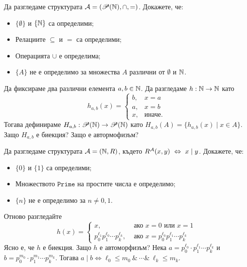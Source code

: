 \begin{problem}
  Да разгледаме структурата $\mathcal{A} = (\mathscr{P}(\mathbb{N}), \cap, =)$.  Докажете, че:
  \begin{itemize}
  \item
    $\{\emptyset\}$ и $\{\mathbb{N}\}$ са определими;
  \item
    Релациите $\subseteq$ и $=$ са определими;
  \item
    Операцията $\cup$ е определима;
  \item
    $\{A\}$ не е определимо за множества $A$ различни от $\emptyset$ и $\mathbb{N}$.
  \end{itemize}
\end{problem}
\begin{hint}
  Да фиксираме два различни елемента $a,b\in\mathbb{N}$.
  Да разгледаме $h:\mathbb{N} \to \mathbb{N}$ като
  \[h_{a,b}(x) =
    \begin{cases}
      b, & x = a\\
      a, & x = b\\
      x, & \text{иначе}.
    \end{cases}\]
  Тогава дефинираме $H_{a,b}:\mathscr{P}(\mathbb{N}) \to \mathscr{P}(\mathbb{N})$ като
  $H_{a,b}(A) = \{h_{a,b}(x) \mid x \in A\}$.
  Защо $H_{a,b}$ е биекция? Защо е автормофизъм?
\end{hint}

\begin{problem}
  Да разгледаме структурата $\mathcal{A} = (\mathbb{N}, R)$, където $R^{\mathcal{A}}(x,y) \ \Leftrightarrow\  x \mid y$.
  Докажете, че:
  \begin{itemize}
  \item
    $\{0\}$ и $\{1\}$ са определими;
  \item
    Множеството $\texttt{Prime}$ на простите числа е определимо;
  \item
    $\{n\}$ не е определимо за $n \neq 0,1$.
  \end{itemize}
\end{problem}
\begin{hint}
  Отново разгледайте
  \[h(x) =
    \begin{cases}
      x, & \text{ ако }x = 0 \text{ или } x = 1\\
      p^{\ell_1}_0p^{\ell_0}_1\cdots p^{\ell_k}_k, & \text{ ако }x = p^{\ell_0}_0 p^{\ell_1}_1 \cdots p^{\ell_k}_k
    \end{cases}\]
  Ясно е, че $h$ е биекция. Защо $h$ е автоморфизъм?
  Нека $a = p^{\ell_0}_0 \cdot p^{\ell_1}_1 \cdots p^{\ell_k}_k$ и $b = p^{m_0}_0 \cdot p^{m_1}_1 \cdots p^{m_k}_k$. Тогава
  $a \mid b \iff \ell_0 \leq m_0\ \&\ \cdots \&\ \ell_k \leq m_k$.
\end{hint}

